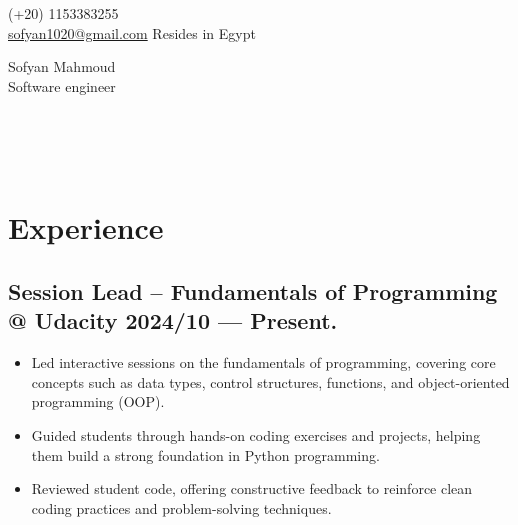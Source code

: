 \documentclass[a4,10pt]{article}
\newenvironment{zitemize}{
\begin{itemize}\itemsep0pt \parskip0pt \parsep1pt}
{\end{itemize}\vspace{-0.5cm}}
\begin{document}
\begin{center}
    \begin{minipage}[b]{0.24\textwidth}
            \large (+20) 1153383255 \\
            \large \href{mailto:sofyan1020@gmail.com}{sofyan1020@gmail.com} 
            \large Resides in Egypt
    \end{minipage}%
    \begin{minipage}[b]{0.5\textwidth}
            \centering
            {\Huge Sofyan Mahmoud} \\ %
            \vspace{0.1cm}
            {\color{UI_blue} \Large{Software engineer}} \\
    \end{minipage}%
    \begin{minipage}[b]{0.24\textwidth}
            \flushright \large  %
            \href{https://www.linkedin.com/in/sofyanmahmoud0000/}{\color{blue}{LinkedIn} } \\
            \href{https://leetcode.com/u/sofyan1020/}{\color{blue}{Leetcode}} \\ 
            \href{https://github.com/sofyanmahmoud0000}{\color{blue}{Github}} \\ 
    \end{minipage}   
    
\vspace{-0.15cm} 
\end{center}
\vspace{-0.25cm}


\section{Experience}

\subsection*{Session Lead – Fundamentals of Programming @ Udacity \hfill 2024/10 --- Present.} 
    \begin{zitemize}
        \item Led interactive sessions on the fundamentals of programming, covering core concepts such as data types, control structures, functions, and object-oriented programming (OOP).
        \item Guided students through hands-on coding exercises and projects, helping them build a strong foundation in Python programming.
        \item Reviewed student code, offering constructive feedback to reinforce clean coding practices and problem-solving techniques.
    \end{zitemize}
\end{document}
